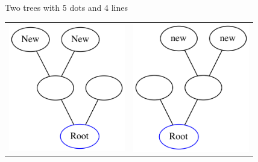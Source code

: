 \documentclass{beamer}
\begin{document}
\begin{frame}
   
    \begin{center}
        \Large Two trees with 5 dots and 4 lines
        
        \bigskip\noindent
    \begin{tabular}{cc}
    \includegraphics[width=2in]{G2.png} & \includegraphics[width=2in]{G3.png}
    \end{tabular}
\end{center}
\end{frame}
\end{document}
